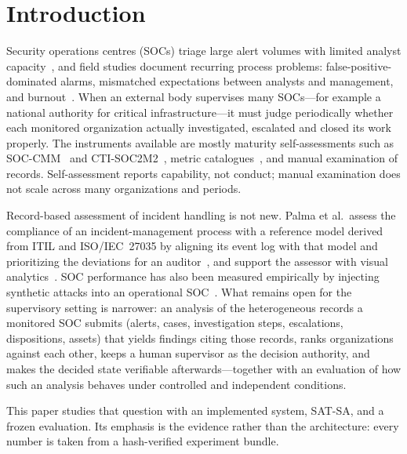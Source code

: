 \section{Introduction}
\label{sec:intro}

Security operations centres (SOCs) triage large alert volumes with limited analyst
capacity~\cite{vielberth2020soc,tariq2025alertfatigue}, and field studies document
recurring process problems: false-positive-dominated alarms, mismatched expectations
between analysts and management, and burnout~\cite{alahmadi2022falsepositives,kokulu2019soc,sundaramurthy2015burnout}.
When an external body supervises many SOCs---for example a national authority for
critical infrastructure---it must judge periodically whether each monitored
organization actually investigated, escalated and closed its work properly. The
instruments available are mostly maturity self-assessments such as
SOC-CMM~\cite{vanos2016soccmm} and CTI-SOC2M2~\cite{schlette2021ctisoc2m2}, metric
catalogues~\cite{forsberg2023metrics,agyepong2023analyst}, and manual examination of
records. Self-assessment reports capability, not conduct; manual examination does not
scale across many organizations and periods.

Record-based assessment of incident handling is not new. Palma et al.\ assess the
compliance of an incident-management process with a reference model derived from
ITIL and ISO/IEC~27035 by aligning its event log with that model and prioritizing
the deviations for an auditor~\cite{palma2024compliance,palma2024benchimp}, and
support the assessor with visual analytics~\cite{palma2024eurova,palma2025impavid}.
SOC performance has also been measured empirically by injecting synthetic attacks
into an operational SOC~\cite{rosso2020saibersoc}. What remains open for the
supervisory setting is narrower: an analysis of the heterogeneous records a monitored
SOC submits (alerts, cases, investigation steps, escalations, dispositions, assets)
that yields findings citing those records, ranks organizations against each other,
keeps a human supervisor as the decision authority, and makes the decided state
verifiable afterwards---together with an evaluation of how such an analysis
behaves under controlled and independent conditions.

This paper studies that question with an implemented system, SAT-SA, and a frozen evaluation. Its emphasis is
the evidence rather than the architecture: every number is taken from a hash-verified
experiment bundle.

